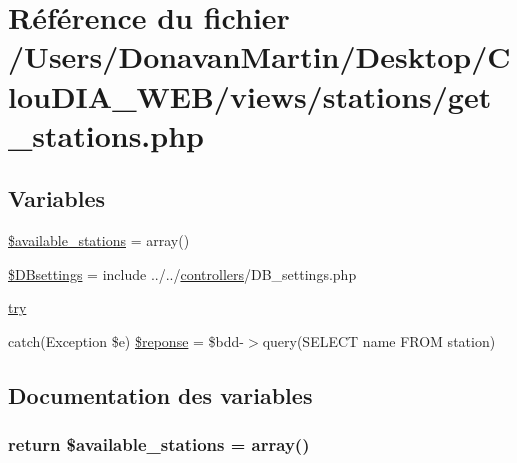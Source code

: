 \hypertarget{get__stations_8php}{}\section{Référence du fichier /\+Users/\+Donavan\+Martin/\+Desktop/\+Clou\+D\+I\+A\+\_\+\+W\+E\+B/views/stations/get\+\_\+stations.php}
\label{get__stations_8php}
\subsection*{Variables}
\begin{DoxyCompactItemize}
\item 
\hyperlink{get__stations_8php_aa2bc9054f006a0b0bed4789c7ccaf375}{\$available\+\_\+stations} = array()
\item 
\hyperlink{get__stations_8php_a9d97b484ee351b8e6034d74504996e9f}{\$\+D\+Bsettings} = include \textquotesingle{}../../\hyperlink{index_8js_ae15548a4836771e65070b7b408b2d46a}{controllers}/D\+B\+\_\+settings.\+php\textquotesingle{}
\item 
\hyperlink{get__stations_8php_abe4cc9788f52e49485473dc699537388}{try}
\item 
catch(Exception \$e) \hyperlink{get__stations_8php_a926b4b5ea87a1a2ca4dd8e85ac78ebeb}{\$reponse} = \$bdd-\/$>$query(\textquotesingle{}S\+E\+L\+E\+C\+T name F\+R\+O\+M station\textquotesingle{})
\end{DoxyCompactItemize}


\subsection{Documentation des variables}
\hypertarget{get__stations_8php_aa2bc9054f006a0b0bed4789c7ccaf375}{}
\subsubsection[{\$available\+\_\+stations}]{\setlength{\rightskip}{0pt plus 5cm}return \$available\+\_\+stations = array()}\label{get__stations_8php_aa2bc9054f006a0b0bed4789c7ccaf375}
\hypertarget{get__stations_8php_a9d97b484ee351b8e6034d74504996e9f}{}
